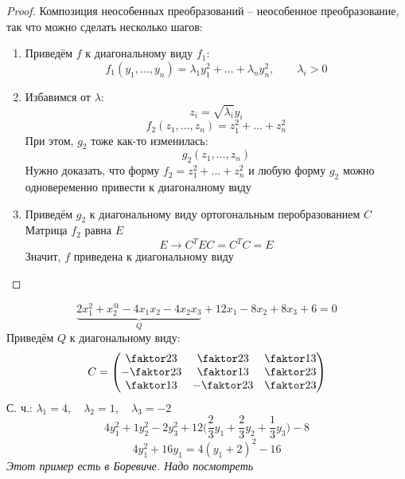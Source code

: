 \begin{proof}
	Композиция неособенных преобразований -- неособенное преобразование, так что можно сделать несколько шагов:
	\begin{enumerate}
		\item Приведём $ f $ к диагональному виду $ f_1 $:
		$$ f_1(y_1, ..., y_n) = \lambda_1y_1^2 + ... + \lambda_ny_n^2, \qquad \lambda_i > 0 $$
		\item Избавимся от $ \lambda $:
		$$ z_i = \sqrt{\lambda_i}y_i $$
		$$ f_2(z_1, ..., z_n) = z_1^2 + ... + z_n^2 $$
		При этом, $ g_2 $ тоже как-то изменилась:
		$$ g_2(z_1, ..., z_n) $$
		Нужно доказать, что форму $ f_2 = z_1^2 + ... + z_n^2 $ и любую форму $ g_2 $ можно одновеременно привести к диагоналному виду
		\item Приведём $ g_2 $ к диагональному виду ортогональным перобразованием $ C $ \\
		Матрица $ f_2 $ равна $ E $
		$$ E \to C^TEC = C^TC = E $$
		Значит, $ f $ приведена к диагональному виду
	\end{enumerate}
\end{proof}

\begin{eg}
	$$ \underbrace{2x_1^2 + x_2^@ - 4x_1x_2 - 4x_2x_3}_{Q} + 12x_1 - 8x_2 + 8x_3 + 6 = 0 $$
	Приведём $ Q $ к диагональному виду:
	$$ C =
	\begin{pmatrix}
		\faktor23 & \faktor23 & \faktor13 \\
		-\faktor23 & \faktor13 & \faktor23 \\
		\faktor13 & -\faktor23 & \faktor23
	\end{pmatrix} $$
	С. ч.: $ \lambda_1 = 4, \quad \lambda_2 = 1, \quad \lambda_3 = -2 $
	$$ 4y_1^2 + 1y_2^2 - 2y_3^2 + 12 \bigg( \frac23 y_1 + \frac23 y_2 + \frac13 y_3 \bigg) - 8 $$
	$$ 4y_1^2 + 16y_1 = 4(y_1 + 2)^2 - 16 $$
	\textit{Этот пример есть в Боревиче. Надо посмотреть}
\end{eg}
